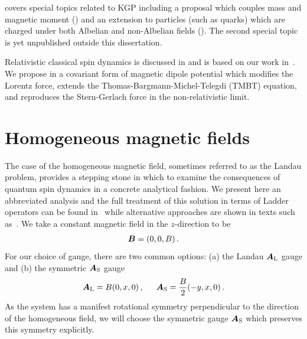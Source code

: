  covers special topics related to KGP including a proposal which couples mass and magnetic moment () and an extension to particles (such as quarks) which are charged under both Albelian and non-Albelian fields (). The second special topic is yet unpublished outside this dissertation.

Relativistic classical spin dynamics is discussed in  and is based on our work in~\cite{Rafelski:2017hce}. We propose in  a covariant form of magnetic dipole potential which modifies the Lorentz force, extends the Thomas-Bargmann-Michel-Telegdi (TMBT) equation, and reproduces the Stern-Gerlach force in the non-relativistic limit. %

\section{Homogeneous magnetic fields}
\label{sec:homogeneous}
\noindent The case of the homogeneous magnetic field, sometimes referred to as the Landau problem, provides a stepping stone in which to examine the consequences of quantum spin dynamics in a concrete analytical fashion. We present here an abbreviated analysis and the full treatment of this solution in terms of Ladder operators can be found in~\cite{Steinmetz:2018ryf} while alternative approaches are shown in texts such as~\cite{Itzykson:1980rh}. We take a constant magnetic field in the $z$-direction to be
\begin{alignat}{1}
	\label{homogeneous:1} \boldsymbol{B}=(0,0,B)\,.
\end{alignat}
For our choice of gauge, there are two common options: (a) the Landau $\boldsymbol{A}_\mathrm{L}$ gauge and (b) the symmetric $\boldsymbol{A}_\mathrm{S}$ gauge
\begin{alignat}{1}
	\label{homogeneous:2} \bb{A}_\mathrm{L}=B(0,x,0)\,,\indent \bb{A}_\mathrm{S}=\frac{B}{2}(-y,x,0)\,.
\end{alignat}
As the system has a manifest rotational symmetry perpendicular to the direction of the homogeneous field, we will choose the symmetric gauge $\boldsymbol{A}_\mathrm{S}$ which preserves this symmetry explicitly.

